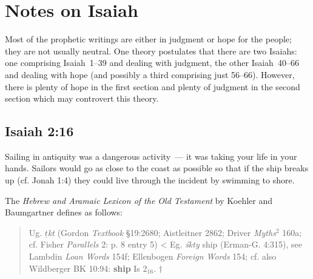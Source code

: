 \chapter{Notes on Isaiah}\label{app:isaiah}
Most of the prophetic writings are either in judgment or hope for the people; they are not usually neutral. One theory postulates that there are two Isaiahs: one comprising Isaiah~1--39 and dealing with judgment, the other Isaiah~40--66 and dealing with hope (and possibly a third comprising just 56--66). However, there is plenty of hope in the first section and plenty of judgment in the second section which may controvert this theory.

\section{Isaiah 2:16}\label{app:isa-2-16}
Sailing in antiquity was a dangerous activity~--- it was taking your life in your hands. Sailors would go as close to the coast as possible so that if the ship breaks up (cf. Jonah 1:4) they could live through the incident by swimming to shore.

The \emph{Hebrew and Aramaic Lexicon of the Old Testament} by Koehler and Baumgartner defines  as follows:
\begin{quote}
    Ug. \emph{$\underline{t}$kt} (Gordon \emph{Textbook} \S19:2680; Aistleitner 2862; Driver \emph{Myths}$^2$ 160a; cf. Fisher \emph{Parallels} 2: p. 8 entry 5) < Eg. \emph{\'skty} ship (Erman-G. 4:315), see Lambdin \emph{Loan Words} 154f; Ellenbogen \emph{Foreign Words} 154; cf. also Wildberger BK 10:94: \textbf{ship} Is 2$_{16}$. $\dagger$
\end{quote}


